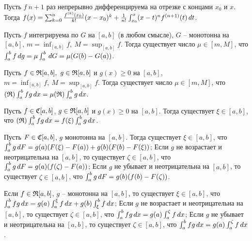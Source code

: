 \documentclass[a4paper]{article}
\newcommand{\билет}[1]{\par\medskip\noindent{\large \textsf{Билет #1.}}\par}
\begin{document}
\begin{theorem} Пусть $f\ n+1$ раз непрерывно
дифференцируема на отрезке с концами $x_0$ и $x$. Тогда
$f(x)=\sum_{k=0}^n\frac{f^{(k)}(x_0)}{k!}(x-x_0)^k+\frac{1}{n!}\int_{x_0}^{x}(x-t)^nf^{(n+1)}(t)\,dt$.
\end{theorem}

\билет  {13}


\begin{theorem} Пусть $f$ интегрируема по $G$ на $[a,b]$ (в любом смысле), $G$ --
монотонна на $[a,b]$, $m=\inf_{[a,b]}f,\ M=\sup_{[a,b]}f$. Тогда существует число $\mu\in[m,M]$, что
$\int_{a}^{b}f\,dg=\mu\int_{a}^{b}\,dG=\mu(G(b)-G(a))$. \end{theorem}

\begin{imp} Пусть $f\in\mathfrak{R}[a,b],\ g\in\mathfrak{R}[a,b]$ и $g(x)\ge0$ на $[a,b]$, $m=\inf_{[a,b]}f,\ M=\sup_{[a,b]}f$. Тогда
существует число $\mu\in[m,M]$, что $(\mathfrak{R})\int_{a}^{b}fg\,dx=\mu(\mathfrak{R})\int_{a}^{b}g\,dx$. \end{imp}

\begin{imp} Пусть $f\in\mathfrak{C}[a,b]$, $g\in\mathfrak{R}[a,b]$  и $g(x)\ge0$ на $[a,b]$. Тогда существует $\xi\in[a,b]$, что
$(\mathfrak{R})\int_{a}^{b}fg\,dx=f(\xi)\int_{a}^{b}g\,dx$. \end{imp}

\begin{theorem} Пусть $F\in\mathfrak{C}[a,b]$, $g$ монотонна на $[a,b]$. Тогда существует
$\xi\in[a,b]$, что $\int_{a}^{b}g\,dF=g(a)(F(\xi)-F(a))+g(b)(F(b)-F(\xi))$; Если $g$ не возрастает и
неотрицательна на $[a,b]$, то существует $\zeta\in[a,b]$, что $\int_{a}^{b}g\,dF=g(a)(f(\zeta)-F(a))$; Если $g$
не убывает и неотрицательна на $[a,b]$, то существует $\zeta\in[a,b]$, что
$\int_{a}^{b}g\,dF=g(b)(f(b)-F(\zeta))$. \end{theorem}

\begin{imp} Если $f\in\mathfrak{R}[a,b]$, $g$ -- монотонна на $[a,b]$, то существует $\xi\in[a,b]$, что
$\int_{a}^{b}fg\,dx=g(a)\int_{a}^{\xi}f\,dx+g(b)\int_{\xi}^{b}f\,dx$; Если $g$ не возрастает и неотрицательна на $[a,b]$,
то существует $\zeta\in[a,b]$, что $\int_{a}^{b}fg\,dx=g(a)\int_{a}^{\zeta}f\,dx$; Если $g$ не убывает и неотрицательна
на $[a,b]$, то существует $\zeta\in[a,b]$, что $\int_{a}^{b}fg\,dx=g(a)\int_{a}^{\zeta}f\,dx$. \end{imp}


\билет  {14}
\end{document}

